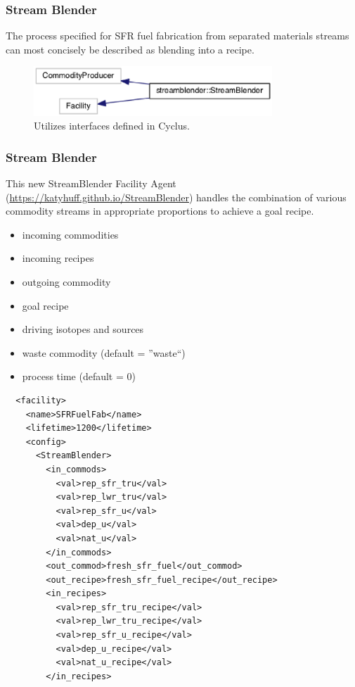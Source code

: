 \begin{frame}[fragile]
  \frametitle{Stream Blender} 
The process specified for SFR fuel fabrication from separated materials streams
can most concisely be described as blending into a recipe.
\begin{figure}[htbp!]
\begin{center}
\includegraphics[width=0.8\textwidth]{sb_inherit}
\end{center}
\caption{Utilizes interfaces defined in Cyclus.}
\label{fig:sb_inherit}
\end{figure}
\end{frame}
\begin{frame}[fragile]
  \frametitle{Stream Blender}
This new StreamBlender Facility Agent 
(\url{https://katyhuff.github.io/StreamBlender}) 
\cite{huff_market_2014} handles the combination of various commodity streams in 
appropriate proportions to achieve a goal recipe.  

\begin{itemize}
\item incoming commodities
\item incoming recipes
\item outgoing commodity
\item goal recipe
\item driving isotopes and sources
\item waste commodity (default = ''waste``)
\item process time (default = 0)
\end{itemize}
\end{frame}
\begin{frame}[fragile]
\footnotesize{
\begin{lstlisting}
  <facility>
    <name>SFRFuelFab</name>
    <lifetime>1200</lifetime>
    <config>
      <StreamBlender>
        <in_commods>
          <val>rep_sfr_tru</val>
          <val>rep_lwr_tru</val>
          <val>rep_sfr_u</val>
          <val>dep_u</val>
          <val>nat_u</val>
        </in_commods>
        <out_commod>fresh_sfr_fuel</out_commod>
        <out_recipe>fresh_sfr_fuel_recipe</out_recipe>
        <in_recipes>
          <val>rep_sfr_tru_recipe</val>
          <val>rep_lwr_tru_recipe</val>
          <val>rep_sfr_u_recipe</val>
          <val>dep_u_recipe</val>
          <val>nat_u_recipe</val>
        </in_recipes>
\end{lstlisting}
}
\end{frame}
